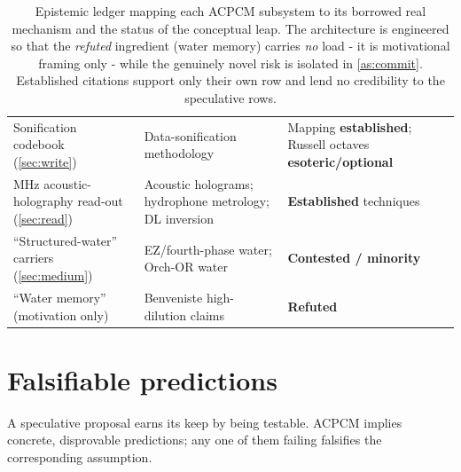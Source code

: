 \documentclass[11pt]{article}
\theoremstyle{definition}
\begin{document}
\begin{table}[!t]
\begin{tabularx}{\textwidth}{@{}>{\raggedright\arraybackslash}p{}
  >{\raggedright\arraybackslash}X
  >{\raggedright\arraybackslash}p{}@{}}
Sonification codebook (\cref{sec:write})
  & Data-sonification methodology~\cite{kramer1999nsf,hermann2011handbook}
  & Mapping \textcolor{acpcmteal}{\bfseries established}; Russell octaves \textcolor{warnrule}{\bfseries esoteric/optional}~\cite{russell1926universalone} \\
MHz acoustic-holography read-out (\cref{sec:read})
  & Acoustic holograms; hydrophone metrology; DL inversion~\cite{melde2016holograms,martin2019hydrophone,lin2021dlholograms}
  & \textcolor{acpcmteal}{\bfseries Established} techniques \\
``Structured-water'' carriers (\cref{sec:medium})
  & EZ/fourth-phase water; Orch-OR water~\cite{pollack2013fourth,hameroff2014orchor}
  & \textcolor{warnrule}{\bfseries Contested / minority}~\cite{elton2020ez,tegmark2000decoherence} \\
``Water memory'' (motivation only)
  & Benveniste high-dilution claims~\cite{benveniste1988}
  & \textbf{Refuted}~\cite{maddox1988} \\
\bottomrule
\end{tabularx}
\caption{Epistemic ledger mapping each ACPCM subsystem to its borrowed real mechanism and
the status of the conceptual leap. The architecture is engineered so that the
\emph{refuted} ingredient (water memory) carries \emph{no} load - it is motivational
framing only - while the genuinely novel risk is isolated in \cref{as:commit}. Established
citations support only their own row and lend no credibility to the speculative rows.}
\label{tab:status}
\end{table}

\section{Falsifiable predictions}
\label{sec:predictions}

A speculative proposal earns its keep by being testable. ACPCM implies concrete, disprovable
predictions; any one of them failing falsifies the corresponding assumption.
\end{document}
